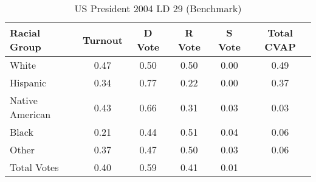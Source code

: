 \begin{table}[htb]
\begin{center}
\caption{US President 2004 LD 29 (Benchmark)}
\label{pres04_cvap_ld_29_benchmark}
\begin{tabular}{lccccc}
  \hline
Racial Group & Turnout & D Vote & R Vote & S Vote & Total CVAP \\ 
  \hline
White & 0.47 & 0.50 & 0.50 & 0.00 & 0.49 \\ 
  Hispanic & 0.34 & 0.77 & 0.22 & 0.00 & 0.37 \\ 
  Native American & 0.43 & 0.66 & 0.31 & 0.03 & 0.03 \\ 
  Black & 0.21 & 0.44 & 0.51 & 0.04 & 0.06 \\ 
  Other & 0.37 & 0.47 & 0.50 & 0.03 & 0.06 \\ 
  Total Votes & 0.40 & 0.59 & 0.41 & 0.01 &  \\ 
   \hline
\end{tabular}
\end{center}
\end{table}
